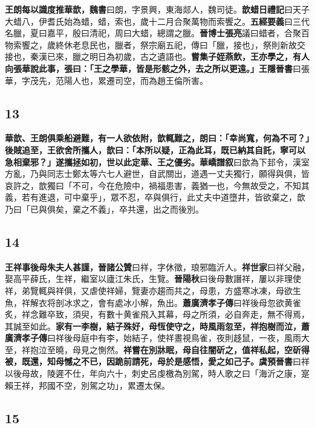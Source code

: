 \textbf{王朗每以識度推華歆，}{\footnotesize \textbf{魏書}曰朗，字景興，東海郯人，魏司徒。}\textbf{歆蜡日}{\footnotesize \textbf{禮記}曰天子大蜡八，伊耆氏始為蜡，蜡，索也，歲十二月合聚萬物而索饗之。\textbf{五經要義}曰三代名臘，夏曰嘉平，殷曰清祀，周曰大蜡，總謂之臘。\textbf{晉博士張亮}議曰蜡者，合聚百物索饗之，歲終休老息民也，臘者，祭宗廟五祀，傳曰「臘，接也」，祭則新故交接也，秦漢已來，臘之明日為初歲，古之遺語也。}\textbf{嘗集子姪燕飲，王亦學之，有人向張華說此事，張曰：「王之學華，皆是形骸之外，去之所以更遠。」}{\footnotesize \textbf{王隱晉書}曰張華，字茂先，范陽人也，累遷司空，而為趙王倫所害。}

\subsection*{13}

\textbf{華歆、王朗俱乘船避難，有一人欲依附，歆輒難之，朗曰：「幸尚寬，何為不可？」後賊追至，王欲舍所攜人，歆曰：「本所以疑，正為此耳，既已納其自託，寧可以急相棄邪？」遂攜拯如初，世以此定華、王之優劣。}{\footnotesize \textbf{華嶠譜叙}曰歆為下邽令，漢室方亂，乃與同志士鄭太等六七人避世，自武關出，道遇一丈夫獨行，願得與俱，皆哀許之，歆獨曰「不可，今在危險中，禍福患害，義猶一也，今無故受之，不知其義，若有進退，可中棄乎」，眾不忍，卒與俱行，此丈夫中道墮井，皆欲棄之，歆乃曰「已與俱矣，棄之不義」，卒共還，出之而後別。}

\subsection*{14}

\textbf{王祥事後母朱夫人甚謹，}{\footnotesize \textbf{晉諸公贊}曰祥，字休徵，琅邪臨沂人。\textbf{祥世家}曰祥父融，娶高平薛氏，生祥，繼室以廬江朱氏，生覽。\textbf{晉陽秋}曰後母數譖祥，屢以非理使祥，弟覽輒與祥俱，又虐使祥婦，覽妻亦趨而共之，母患，方盛寒冰凍，母欲生魚，祥解衣将剖冰求之，會有處冰小解，魚出。\textbf{蕭廣濟孝子傳}曰祥後母忽欲黄雀炙，祥念難卒致，須臾，有數十黄雀飛入其幕，母之所須，必自奔走，無不得焉，其誠至如此。}\textbf{家有一李樹，結子殊好，母恆使守之，時風雨忽至，祥抱樹而泣，}{\footnotesize \textbf{蕭廣濟孝子傳}曰祥後母庭中有李，始結子，使祥晝視鳥雀，夜則趍鼠，一夜，風雨大至，祥抱泣至曉，母見之惻然。}\textbf{祥嘗在別牀眠，母自往闇斫之，值祥私起，空斫得被，既還，知母憾之不已，因跪前請死，母於是感悟，愛之如己子。}{\footnotesize \textbf{虞預晉書}曰祥以後母故，陵遲不仕，年向六十，刺史呂虔檄為別駕，時人歌之曰「海沂之康，寔賴王祥，邦國不空，別駕之功」，累遷太保。}

\subsection*{15}

